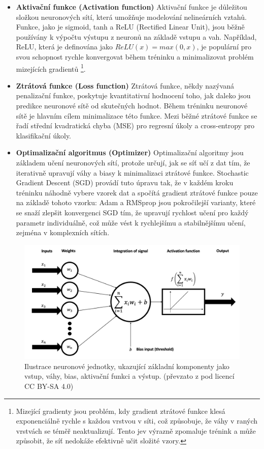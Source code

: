 \documentclass[male,czech,api_ing]{thesis}
\begin{document}
\begin{itemize}
\begin{itemize}
        \end{itemize}
    \item \textbf{Aktivační funkce (Activation function)} Aktivační funkce je důležitou složkou neuronových sítí, která umožňuje modelování nelineárních vztahů. Funkce, jako je sigmoid, tanh a ReLU (Rectified Linear Unit), jsou běžně používány k výpočtu výstupu z neuronů na základě vstupu a vah. Například, ReLU, která je definována jako $ReLU(x) = max(0, x)$, je populární pro svou schopnost rychle konvergovat během tréninku a minimalizovat problém mizejících gradientů \footnote{Mizející gradienty jsou problém, kdy gradient ztrátové funkce klesá exponenciálně rychle s každou vrstvou v síti, což způsobuje, že váhy v raných vrstvách se téměř neaktualizují. Tento jev výrazně zpomaluje trénink a může způsobit, že síť nedokáže efektivně učit složité vzory.}.
    \item \textbf{Ztrátová funkce (Loss function)} Ztrátová funkce, někdy nazývaná penalizační funkce, poskytuje kvantitativní hodnocení toho, jak daleko jsou predikce neuronové sítě od skutečných hodnot. Během tréninku neuronové sítě je hlavním cílem minimalizace této funkce. Mezi běžné ztrátové funkce se řadí střední kvadratická chyba (MSE) pro regresní úkoly a cross-entropy pro klasifikační úkoly. 
    \item \textbf{Optimalizační algoritmus (Optimizer)} Optimalizační algoritmy jsou základem učení neuronových sítí, protože určují, jak se síť učí z dat tím, že iterativně upravují váhy a biasy k minimalizaci ztrátové funkce. Stochastic Gradient Descent (SGD) provádí tuto úpravu tak, že v každém kroku tréninku náhodně vybere vzorek dat a spočítá gradient ztrátové funkce pouze na základě tohoto vzorku:
    Adam a RMSprop jsou pokročilejší varianty, které se snaží zlepšit konvergenci SGD tím, že upravují rychlost učení pro každý parametr individuálně, což může vést k rychlejšímu a stabilnějšímu učení, zejména v komplexních sítích.
\end{itemize}

\begin{figure}[ht]
    \centering
    \includegraphics[width=\linewidth]{Prilohy/Obrazky/NNComponents.png}
    \caption{Ilustrace neuronové jednotky, ukazující základní komponenty jako vstup, váhy, bias, aktivační funkci a výstup. (převzato z \cite{NNComponentsIMG} pod licencí CC BY-SA 4.0)}
    \label{fig:nn_components}
\end{figure}
\end{document}
